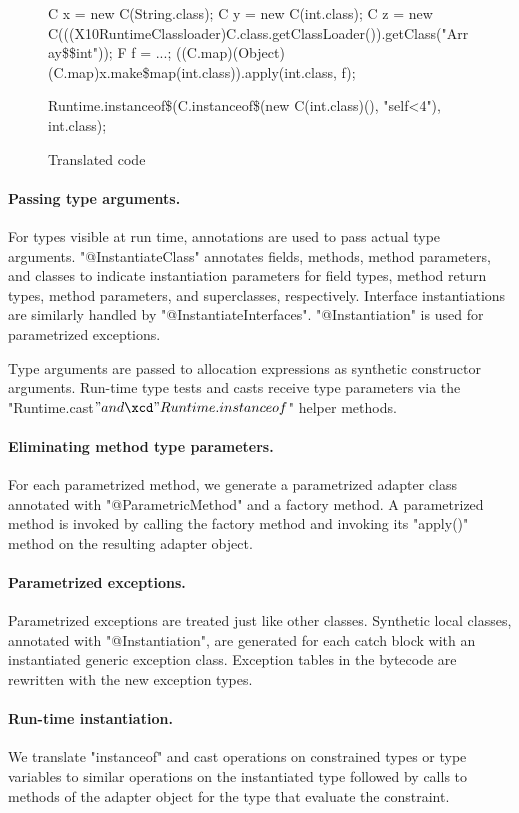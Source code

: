{\begin{figure*}[tp]
{\begin{xten}
C x = new C(String.class);
C y = new C(int.class);
C z = new C(((X10RuntimeClassloader)C.class.getClassLoader()).getClass("Array\$\$int"));
F f = ...;
((C.map)(Object)(C.map)x.make\$map(int.class)).apply(int.class, f);

Runtime.instanceof\$(C.instanceof\$(new C(int.class)(), "self<4"), int.class);
\end{xten}}
\caption{Translated code}
\label{fig:translation2}
\end{figure*}
}

\paragraph{Passing type arguments.}

For types visible at run time, annotations are used to
pass actual type arguments.  \xcd"@InstantiateClass"
annotates fields, methods,
method parameters, and classes to
indicate instantiation parameters for field
types, method return types, method parameters, and superclasses,
respectively.
Interface instantiations are similarly handled
by \xcd"@InstantiateInterfaces".
\xcd"@Instantiation"
is used for parametrized exceptions.

Type arguments are passed to allocation expressions as
synthetic constructor arguments.  Run-time type tests and casts
receive type parameters via the \xcd"Runtime.cast$" and
\xcd"Runtime.instanceof$" helper methods.

\paragraph{Eliminating method type parameters.}

For each parametrized method, we generate a parametrized
adapter class annotated with \xcd"@ParametricMethod" and a
factory method.
A parametrized method is invoked by calling the factory method
and invoking its
\xcd"apply()" method on the resulting adapter object.

\paragraph{Parametrized exceptions.}

Parametrized exceptions are treated just like other classes.
Synthetic local classes, annotated with \xcd"@Instantiation",
are generated for each catch block with an instantiated
generic exception class.  Exception tables in the
bytecode are rewritten with the new exception types.

\paragraph{Run-time instantiation.}

We translate \xcd"instanceof" and cast operations on
constrained types or type variables
to
similar operations on the instantiated type followed by calls
to
methods of the adapter object for the type
that evaluate the constraint.
